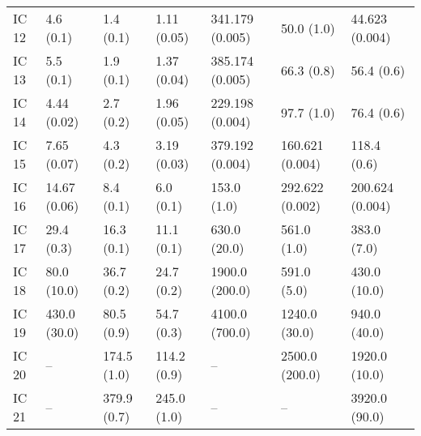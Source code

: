 \begin{tabular}{lllllll}
IC 12 &         4.6 (0.1) &             1.4 (0.1) &        1.11 (0.05) &         341.179 (0.005) &                  50.0 (1.0) &           44.623 (0.004) \\
IC 13 &         5.5 (0.1) &             1.9 (0.1) &        1.37 (0.04) &         385.174 (0.005) &                  66.3 (0.8) &               56.4 (0.6) \\
IC 14 &       4.44 (0.02) &             2.7 (0.2) &        1.96 (0.05) &         229.198 (0.004) &                  97.7 (1.0) &               76.4 (0.6) \\
IC 15 &       7.65 (0.07) &             4.3 (0.2) &        3.19 (0.03) &         379.192 (0.004) &             160.621 (0.004) &              118.4 (0.6) \\
IC 16 &      14.67 (0.06) &             8.4 (0.1) &          6.0 (0.1) &             153.0 (1.0) &             292.622 (0.002) &          200.624 (0.004) \\
IC 17 &        29.4 (0.3) &            16.3 (0.1) &         11.1 (0.1) &            630.0 (20.0) &                 561.0 (1.0) &              383.0 (7.0) \\
IC 18 &       80.0 (10.0) &            36.7 (0.2) &         24.7 (0.2) &          1900.0 (200.0) &                 591.0 (5.0) &             430.0 (10.0) \\
IC 19 &      430.0 (30.0) &            80.5 (0.9) &         54.7 (0.3) &          4100.0 (700.0) &               1240.0 (30.0) &             940.0 (40.0) \\
IC 20 &                -- &           174.5 (1.0) &        114.2 (0.9) &                      -- &              2500.0 (200.0) &            1920.0 (10.0) \\
IC 21 &                -- &           379.9 (0.7) &        245.0 (1.0) &                      -- &                          -- &            3920.0 (90.0) \\
\bottomrule
\end{tabular}
